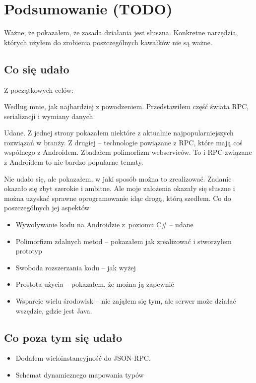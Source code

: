 \chapter{Podsumowanie (TODO)}
Ważne, że pokazałem, że zasada działania jest słuszna. Konkretne narzędzia, których użyłem do zrobienia poszczególnych kawałków nie są ważne.

\section{Co się udało}
Z początkowych celów:
\begin{description}
Według mnie, jak najbardziej z powodzeniem. Przedstawiłem część świata RPC, serializacji i wymiany danych.

Udane. Z jednej strony pokazałem niektóre z aktualnie najpopularniejszych rozwiązań w branży. Z drugiej -- technologie powiązane z RPC, które mają coś wspólnego z Androidem. Zbadałem polimorfizm webserviców. To i RPC związane z Androidem to nie bardzo popularne tematy.

Nie udało się, ale pokazałem, w jaki sposób można to zrealizować. Zadanie okazało się zbyt szerokie i ambitne. Ale moje założenia okazały się słuszne i można uzyskać sprawne oprogramowanie idąc drogą, którą szedłem. Co do poszczególnych jej aspektów
\begin{itemize}
  \item Wywoływanie kodu na Androidzie z~poziomu C\# -- udane
	\item Polimorfizm zdalnych metod -- pokazałem jak zrealizować i stworzyłem prototyp
	\item Swoboda rozszerzania kodu -- jak wyżej
	\item Prostota użycia -- pokazałem, że można ją zapewnić
	\item Wsparcie wielu środowisk -- nie zająłem się tym, ale serwer może działać wszędzie, gdzie jest Java.
\end{itemize}

\end{description}

\section{Co poza tym się udało}
\begin{itemize}
	\item Dodałem wieloinstancyjność do JSON-RPC.
	\item Schemat dynamicznego mapowania typów
\end{itemize}


